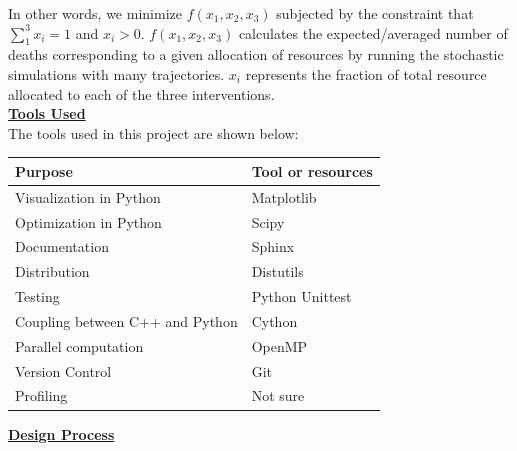 \documentclass[11pt,letter]{article}
\begin{document}
In other words, we minimize $f(x_1,x_2,x_3)$ subjected by the constraint that $\sum\limits_{1}^{3}x_i=1$ and $x_i>0$. $f(x_1,x_2,x_3)$ calculates the expected/averaged number of deaths corresponding to a given allocation of resources by running the stochastic simulations with many trajectories. $x_i$ represents the fraction of total resource allocated to each of the three interventions. \\

\underline{\textbf{Tools Used}}\vspace{-0.5mm}\\

The tools used in this project are shown below:


\begin{center}
\centering
	\begin{tabular}{ l | p{13cm}}
           \textbf{Purpose} & \textbf{Tool or resources} \\ \hline
	Visualization in Python & Matplotlib \\
	Optimization in Python & Scipy \\
	Documentation  & Sphinx \\
	Distribution & Distutils \\
         Testing  & Python Unittest \\
         Coupling between C++ and Python & Cython \\
         Parallel computation & OpenMP \\
         Version Control & Git \\
         Profiling & Not sure 
         
	\end{tabular}
\end{center}

\underline{\textbf{Design Process}}\vspace{0.5mm}\\
\end{document}
